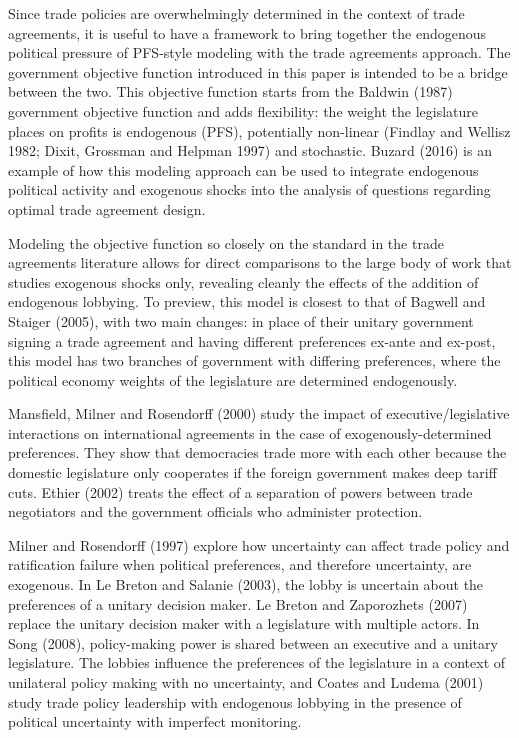 \documentclass[10pt]{article}
\begin{document}
Since trade policies are overwhelmingly determined in the context of trade agreements, it is useful to have a framework to bring together the endogenous political pressure of PFS-style modeling with the trade agreements approach. The government objective function introduced in this paper is intended to be a bridge between the two. This objective function starts from the Baldwin (1987) government objective function and adds flexibility: the weight the legislature places on profits is endogenous (PFS), potentially non-linear (Findlay and Wellisz 1982; Dixit, Grossman and Helpman 1997) and stochastic. Buzard (2016) is an example of how this modeling approach can be used to integrate  endogenous political activity and exogenous shocks into the analysis of questions regarding optimal trade agreement design.

Modeling the objective function so closely on the standard in the trade agreements literature allows for direct comparisons to the large body of work that studies exogenous shocks only, revealing cleanly the effects of the addition of endogenous lobbying. To preview, this model is closest to that of Bagwell and Staiger (2005), with two main changes: in place of their unitary government signing a trade agreement and having different preferences ex-ante and ex-post, this model has two branches of government with differing preferences, where the political economy weights of the legislature are determined endogenously.
		
Mansfield, Milner and Rosendorff (2000) study the impact of executive/legislative interactions on international agreements in the case of exogenously-determined preferences. They show that democracies trade more with each other because the domestic legislature only cooperates if the foreign government makes deep tariff cuts. Ethier (2002) treats the effect of a separation of powers between trade negotiators and the government officials who administer protection.

Milner and Rosendorff (1997) explore how uncertainty can affect trade policy and ratification failure when political preferences, and therefore uncertainty, are exogenous. In Le Breton and Salanie (2003), the lobby is uncertain about the preferences of a unitary decision maker. Le Breton and Zaporozhets (2007) replace the unitary decision maker with a legislature with multiple actors. In Song (2008), policy-making power is shared between an executive and a unitary legislature. The lobbies influence the preferences of the legislature in a context of unilateral policy making with no uncertainty, and Coates and Ludema (2001) study trade policy leadership with endogenous lobbying in the presence of political uncertainty with imperfect monitoring.
\end{document}
